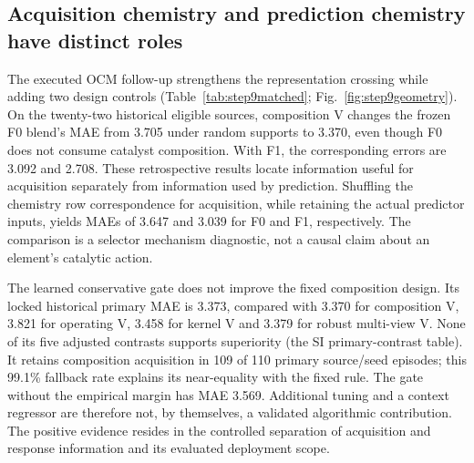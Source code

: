 \subsection{Acquisition chemistry and prediction chemistry have distinct roles}
The executed OCM follow-up strengthens the representation crossing while adding two design controls (Table~\ref{tab:step9matched}; Fig.~\ref{fig:step9geometry}). On the twenty-two historical eligible sources, composition V changes the frozen F0 blend's MAE from 3.705 under random supports to 3.370, even though F0 does not consume catalyst composition. With F1, the corresponding errors are 3.092 and 2.708. These retrospective results locate information useful for acquisition separately from information used by prediction. Shuffling the chemistry row correspondence for acquisition, while retaining the actual predictor inputs, yields MAEs of 3.647 and 3.039 for F0 and F1, respectively. The comparison is a selector mechanism diagnostic, not a causal claim about an element's catalytic action.



The learned conservative gate does not improve the fixed composition design. Its locked historical primary MAE is 3.373, compared with 3.370 for composition V, 3.821 for operating V, 3.458 for kernel V and 3.379 for robust multi-view V. None of its five adjusted contrasts supports superiority (the SI primary-contrast table). It retains composition acquisition in 109 of 110 primary source/seed episodes; this 99.1\% fallback rate explains its near-equality with the fixed rule. The gate without the empirical margin has MAE 3.569. Additional tuning and a context regressor are therefore not, by themselves, a validated algorithmic contribution. The positive evidence resides in the controlled separation of acquisition and response information and its evaluated deployment scope.

